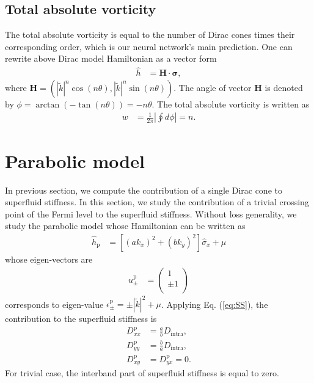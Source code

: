 \documentclass{article}
\begin{document}
\subsection{Total absolute vorticity}
The total absolute vorticity is equal to the number of Dirac cones times their corresponding order, which is our neural network's main prediction. One can rewrite above Dirac model Hamiltonian as a vector form 
\begin{align}
    \hat{h} &= \mathbf{H} \cdot \bm{\sigma},
\end{align}
where $ \mathbf{H}= \left(|\widetilde{k}|^n \cos(n \theta),|\widetilde{k}|^n \sin(n \theta) \right) $. The angle of vector $ \mathbf{H} $ is denoted by $ \phi = \arctan(-\tan(n \theta)) = -n \theta $. The total absolute vorticity is written as 
\begin{align}
    w &= \frac{1}{2\pi}\left\vert \oint d \phi  \right\vert =  n. 
\end{align}

\section{Parabolic model}
In previous section, we compute the contribution of a single Dirac cone to superfluid stiffness. In this section, we study the contribution of a trivial crossing point of the Fermi level to the superfluid stiffness. Without loss generality, we study the parabolic model whose Hamiltonian can be written as 
\begin{align}
    \hat{h}_{\textrm{p}} &= \left[(a k_x)^2 + (b k_y)^2\right] \hat{\sigma}_x + \mu 
\end{align}
whose eigen-vectors are 
\begin{align}
    u^{\textrm{p}} _\pm &= \left(\begin{array}{c}
         1 \\
         \pm 1 \\
    \end{array}\right)
\end{align}
corresponds to eigen-value $\epsilon^{\textrm{p}}_\pm =  \pm |\widetilde{k}|^2 + \mu  $. Applying Eq. (\ref{eq:SS}), the contribution to the superfluid stiffness is 
\begin{align}
    D^{\textrm{p}} _{xx} &= \frac{a}{b}D_{\textrm{intra}}, \\   
    D^{\textrm{p}} _{yy} &= \frac{b}{a}D_{\textrm{intra}}, \\   
    D^{\textrm{p}} _{xy} &= D^{\textrm{p}}_{yx} =0. 
\end{align}
For trivial case, the interband part of superfluid stiffness is equal to zero. 
\end{document}
